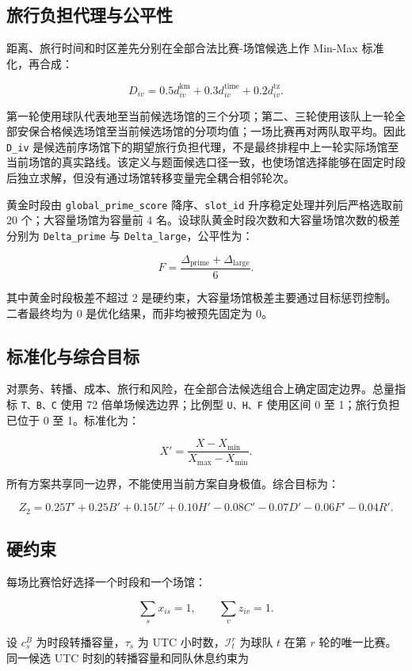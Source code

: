\subsection{旅行负担代理与公平性}

距离、旅行时间和时区差先分别在全部合法比赛-场馆候选上作 Min-Max 标准化，再合成：

\[
D_{iv}=0.5d_{iv}^{\mathrm{km}}
+0.3d_{iv}^{\mathrm{time}}
+0.2d_{iv}^{\mathrm{tz}}.
\]

第一轮使用球队代表地至当前候选场馆的三个分项；第二、三轮使用该队上一轮全部安保合格候选场馆至当前候选场馆的分项均值；一场比赛再对两队取平均。因此 \texttt{D\_iv} 是候选前序场馆下的期望旅行负担代理，不是最终排程中上一轮实际场馆至当前场馆的真实路线。该定义与题面候选口径一致，也使场馆选择能够在固定时段后独立求解，但没有通过场馆转移变量完全耦合相邻轮次。

黄金时段由 \texttt{global\_prime\_score} 降序、\texttt{slot\_id} 升序稳定处理并列后严格选取前 20 个；大容量场馆为容量前 4 名。设球队黄金时段次数和大容量场馆次数的极差分别为 \texttt{Delta\_prime} 与 \texttt{Delta\_large}，公平性为：

\[
F=\frac{\Delta_{\mathrm{prime}}+\Delta_{\mathrm{large}}}{6}.
\]

其中黄金时段极差不超过 2 是硬约束，大容量场馆极差主要通过目标惩罚控制。二者最终均为 0 是优化结果，而非均被预先固定为 0。

\subsection{标准化与综合目标}

对票务、转播、成本、旅行和风险，在全部合法候选组合上确定固定边界。总量指标 \texttt{T、B、C} 使用 72 倍单场候选边界；比例型 \texttt{U、H、F} 使用区间 0 至 1；旅行负担已位于 0 至 1。标准化为：

\[
X'=\frac{X-X_{\min}}{X_{\max}-X_{\min}}.
\]

所有方案共享同一边界，不能使用当前方案自身极值。综合目标为：

\[
Z_2=0.25T'+0.25B'+0.15U'+0.10H'
-0.08C'-0.07D'-0.06F'-0.04R'.
\]

\subsection{硬约束}

每场比赛恰好选择一个时段和一个场馆：

\[
\sum_s x_{is}=1,\qquad \sum_v z_{iv}=1.
\]

设 $c_s^{B}$ 为时段转播容量，$\tau_s$ 为 UTC 小时数，$\mathcal I_t^r$ 为球队 $t$ 在第 $r$ 轮的唯一比赛。同一候选 UTC 时刻的转播容量和同队休息约束为

